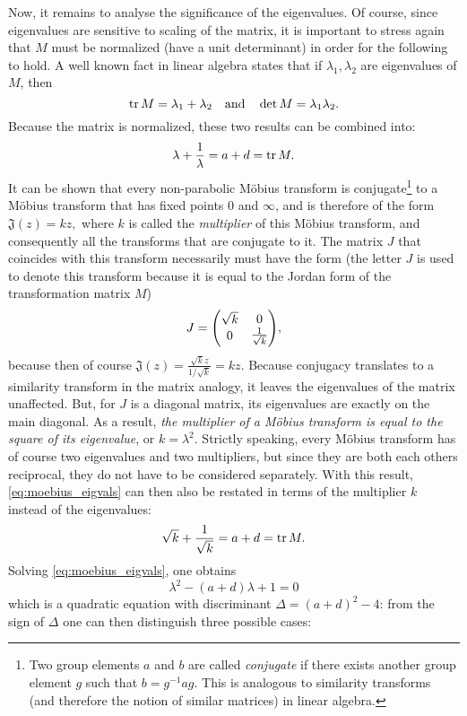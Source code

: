 Now, it remains to analyse the significance of the eigenvalues. Of course, since eigenvalues are sensitive to scaling of the matrix, it is important to stress again that \(M\) must be normalized (have a unit determinant) in order for the following to hold. A well known fact in linear algebra states that if \(\lambda_1, \lambda_2\) are eigenvalues of \(M\), then
\[ \trace{M} = \lambda_1 + \lambda_2 \quad\text{and}\quad \det M  = \lambda_1 \lambda_2.\]
Because the matrix is normalized, these two results can be combined into:
\begin{equation}
    \lambda + \frac{1}{\lambda} = a + d = \trace{M}.
    \label{eq:moebius_eigvals}
\end{equation}
It can be shown that every non-parabolic Möbius transform is conjugate\footnote{Two group elements \(a\) and \(b\) are called \emph{conjugate} if there exists another group element \(g\) such that \(b = g^{-1}ag\). This is analogous to similarity transforms (and therefore the notion of similar matrices) in linear algebra. } to a Möbius transform that has fixed points 0 and \(\infty\), and is therefore of the form
\(\mathfrak{J}(z) = kz,\)
where \(k\) is called the \emph{multiplier} of this Möbius transform, and consequently all the transforms that are conjugate to it. The matrix \(J\) that coincides with this transform necessarily must have the form (the letter \(J\) is used to denote this transform because it is equal to the Jordan form of the transformation matrix \(M\)) \cite{Needham1997}
\[J = \mqty(\dmat[0]{\sqrt{k}, \frac{1}{\sqrt{k}}}), \]
because then of course \(\mathfrak{J}(z) = \frac{\sqrt{k}z}{1/\sqrt{k}} = kz\). Because conjugacy translates to a similarity transform in the matrix analogy, it leaves the eigenvalues of the matrix unaffected. But, for \(J\) is a diagonal matrix, its eigenvalues are exactly on the main diagonal. As a result, \emph{the multiplier of a Möbius transform is equal to the square of its eigenvalue}, or \(k = \lambda^2\). Strictly speaking, every Möbius transform has of course two eigenvalues and two multipliers, but since they are both each others reciprocal, they do not have to be considered separately. With this result, \cref{eq:moebius_eigvals} can then also be restated in terms of the multiplier \(k\) instead of the eigenvalues:
    \[\sqrt{k} + \frac{1}{\sqrt{k}} = a + d = \trace{M}.\]
Solving \cref{eq:moebius_eigvals}, one obtains
 \[ \lambda^2 - (a + d)\lambda + 1 = 0\]
 which is a quadratic equation with discriminant \(\Delta = (a + d)^2 - 4\): from the sign of \(\Delta\) one can then distinguish three possible cases:
